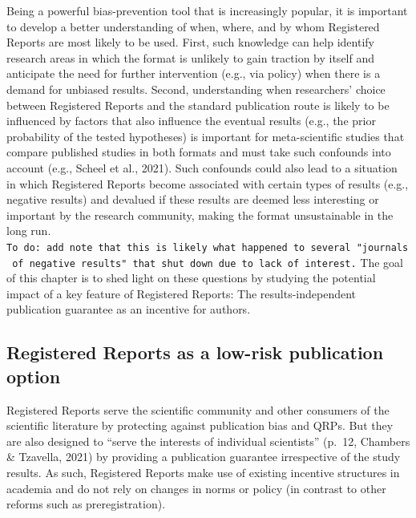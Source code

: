 \documentclass[british,,man,mask,floatsintext]{apa6}
\begin{document}
Being a powerful bias-prevention tool that is increasingly popular, it is important to develop a better understanding of when, where, and by whom Registered Reports are most likely to be used.
First, such knowledge can help identify research areas in which the format is unlikely to gain traction by itself and anticipate the need for further intervention (e.g., via policy) when there is a demand for unbiased results.
Second, understanding when researchers' choice between Registered Reports and the standard publication route is likely to be influenced by factors that also influence the eventual results (e.g., the prior probability of the tested hypotheses) is important for meta-scientific studies that compare published studies in both formats and must take such confounds into account (e.g., Scheel et al., 2021).
Such confounds could also lead to a situation in which Registered Reports become associated with certain types of results (e.g., negative results) and devalued if these results are deemed less interesting or important by the research community, making the format unsustainable in the long run. \texttt{To\ do:\ add\ note\ that\ this\ is\ likely\ what\ happened\ to\ several\ "journals\ of\ negative\ results"\ that\ shut\ down\ due\ to\ lack\ of\ interest.}
The goal of this chapter is to shed light on these questions by studying the potential impact of a key feature of Registered Reports: The results-independent publication guarantee as an incentive for authors.

\hypertarget{registered-reports-as-a-low-risk-publication-option}{%
\subsection{Registered Reports as a low-risk publication option}\label{registered-reports-as-a-low-risk-publication-option}}

Registered Reports serve the scientific community and other consumers of the scientific literature by protecting against publication bias and QRPs.
But they are also designed to \enquote{serve the interests of individual scientists} (p.~12, Chambers \& Tzavella, 2021) by providing a publication guarantee irrespective of the study results.
As such, Registered Reports make use of existing incentive structures in academia and do not rely on changes in norms or policy (in contrast to other reforms such as preregistration).
\end{document}
